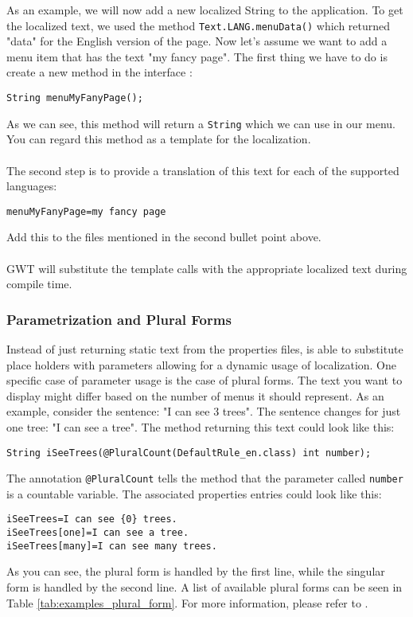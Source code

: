 As an example, we will now add a new localized String to the application. To get the localized text, we used the method \texttt{Text.LANG.menuData()} which returned "data" for the English version of the page. Now let's assume we want to add a menu item that has the text "my fancy page". The first thing we have to do is create a new method in the interface :
\begin{lstlisting}[style=Java]
String menuMyFanyPage();
\end{lstlisting}
\noindent
As we can see, this method will return a \texttt{String} which we can use in our menu. You can regard this method as a template for the localization.\\
\\
The second step is to provide a translation of this text for each of the supported languages:
\begin{lstlisting}[style=Properties]
menuMyFanyPage=my fancy page
\end{lstlisting}
Add this to the files mentioned in the second bullet point above.\\
\\
GWT will substitute the template calls with the appropriate localized text during compile time.

\subsubsection{Parametrization and Plural Forms}
Instead of just returning static text from the properties files, {\germinate} is able to substitute place holders with parameters allowing for a dynamic usage of localization. One specific case of parameter usage is the case of plural forms. The text you want to display might differ based on the number of menus it should represent. As an example, consider the sentence: "I can see 3 trees". The sentence changes for just one tree: "I can see a tree". The method returning this text could look like this:

\begin{lstlisting}[style=Java]
String iSeeTrees(@PluralCount(DefaultRule_en.class) int number);
\end{lstlisting}
\noindent
The annotation \texttt{@PluralCount} tells the method that the parameter called \texttt{number} is a countable variable.
The associated properties entries could look like this:
\begin{lstlisting}[style=Properties]
iSeeTrees=I can see {0} trees.
iSeeTrees[one]=I can see a tree.
iSeeTrees[many]=I can see many trees.
\end{lstlisting}
As you can see, the plural form is handled by the first line, while the singular form is handled by the second line. A list of available plural forms can be seen in Table \ref{tab:examples_plural_form}. For more information, please refer to \cite{GWTPluralForms}.

